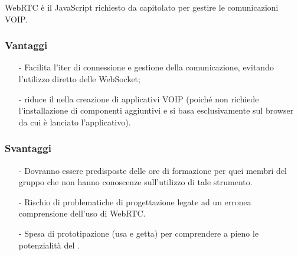 WebRTC è il  JavaScript richiesto da capitolato per gestire le comunicazioni VOIP.

\subsubsection*{Vantaggi}
\begin{itemize}[noitemsep,nolistsep]
	\item[-] Facilita l'iter di connessione e gestione della comunicazione, evitando l'utilizzo diretto delle WebSocket;
	\item[-] riduce il  nella creazione di applicativi VOIP (poiché non richiede l'installazione di componenti aggiuntivi e si basa esclusivamente sul browser da cui è lanciato l'applicativo).
\end{itemize}

\subsubsection*{Svantaggi}
\begin{itemize}[noitemsep,nolistsep]
  \item[-] Dovranno essere predisposte delle ore di formazione per quei membri del gruppo che non hanno conoscenze sull'utilizzo di tale strumento.
  \item[-] Rischio di problematiche di progettazione legate ad un erronea comprensione dell'uso di WebRTC.
  \item[-] Spesa di prototipazione (usa e getta) per comprendere a pieno le potenzialità del .
\end{itemize}

\clearpage

